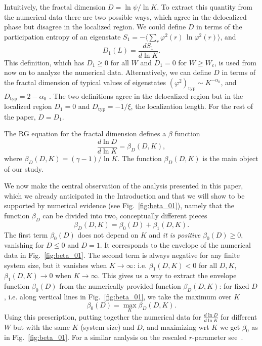 \documentclass[reprint,aps,prl,superscriptaddress,english,nolongbibliography]{revtex4-2}
\begin{document}
{Intuitively, the fractal dimension $D=\ln\psi/\ln K$. To extract this quantity from the numerical data there are two possible ways, which agree in the delocalized phase but disagree in the localized region. We could define $D$ in terms of the participation entropy of an eigenstate $S_1=-\langle\sum_{r}\varphi^{2}(r)\,\ln \varphi^{2}(r)\rangle$, and
\begin{equation}
\label{eq:fract_dim}
    D_1(L)=\frac{dS_1}{d\ln K}.
\end{equation}
This definition, which has $D_1\geq 0$ for all $W$ and $D_1=0$ for $W\geq W_c$, is used from now on to analyze the numerical data. 
Alternatively, we can define $D$ in terms of the fractal dimension of typical values of eigenstates $(\varphi^2)_{\mathrm{typ}}\sim K^{-\alpha_0}$, and $D_{\mathrm{typ}}=2-\alpha_0$ \cite{kravtsov2018non}. 
The two definitions agree in the delocalized region but in the localized region $D_1=0$ and $D_{\mathrm{typ}}=-1/\xi$, the localization length. For the rest of the paper, $D=D_1$.

The RG equation for the fractal dimension defines a $\beta$ function
\begin{equation}
    \frac{d\ln D}{d\ln K}=\beta_D(D,K),
\end{equation}
where $\beta_D(D,K)=(\gamma-1)/\ln K$.
The function $\beta_D(D,K)$ is the main object of our study.

We now make the central observation of the analysis presented in this paper, which we already anticipated in the Introduction and that we will show to be supported by numerical evidence (see Fig.~\ref{fig:beta_01}), namely that the function $\beta_D$ can be divided into two, conceptually different pieces
\begin{equation}
    \beta_D(D,K)=\beta_0(D)+\beta_1(D,K).
\end{equation}
The first term $\beta_0(D)$ does not depend on $K$ and {\it it is positive} $\beta_0(D)\geq 0$, vanishing for $D\leq 0$ and $D=1$. It corresponds to the envelope of the numerical data in Fig.~\ref{fig:beta_01}. The second term is always negative for any finite system size, but it vanishes when $K \to \infty$: i.e. $\beta_1(D,K)< 0$ for all $D,K$, $\beta_1(D,K)\to 0$ when $K\to\infty$. This gives us a way to extract the envelope function $\beta_0(D)$ from the numerically provided function $\beta_D(D,K)$: for fixed $D$, i.e. along vertical lines in Fig.~\ref{fig:beta_01}, we take the maximum over $K$
\begin{equation}
\label{eq:max}
    \beta_0(D)=\max_{K}\beta_D(D,K).
\end{equation}    
Using this prescription, putting together the numerical data for $\frac{d\ln D}{d\ln K}$ for different $W$ but with the same $K$ (system size) and $D$, and maximizing wrt $K$ we get $\beta_0$ as in Fig.~\ref{fig:beta_01}. For a similar analysis on the rescaled $r$-parameter see~\cite{SupplMat}.

}
\end{document}
